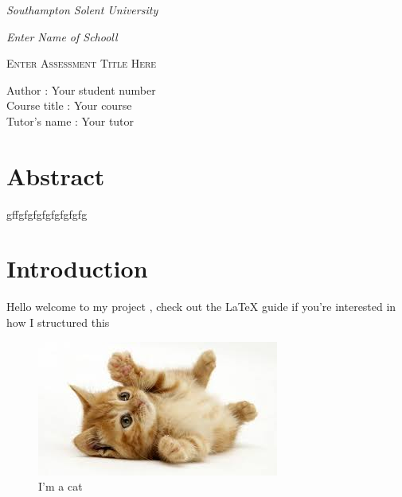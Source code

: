 \documentclass[12pt,a4paper]{article}
\begin{document}
\begin{titlepage}
{\fontsize{14}{12} \emph{Southampton Solent University}\par}
{\fontsize{14}{12}  \emph{Enter Name of Schooll} \par}
\centering
\vspace{10 cm}
{\scshape\Huge Enter Assessment Title Here\par}
\vspace{10cm}	
\begin{flushleft}

Author	        \hspace{1.12cm} 	: Your student number   \\
Course title	\hspace{0.2cm} 	: Your course  \\
Tutor's name	\hspace{0.00cm}       : Your tutor   \\

\end{flushleft}
 
\end{titlepage}

\tableofcontents

\clearpage

\listoffigures

\clearpage


\section{Abstract}
gffgfgfgfgfgfgfgfg \cite{einstein}
\section{Introduction}

Hello welcome to my project , check out the LaTeX guide if you're interested in how I structured this \cite{latex:guide}

\begin{figure}[h!]
	\centering
	\includegraphics{assets/cat.jpeg}
	 \caption{I'm a cat}
	 \label{fig:cat}
\end{figure}
\end{document}
